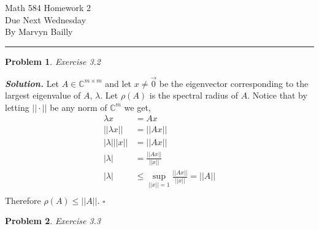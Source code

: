\documentclass[12pt]{report}
\newtheorem{problem}{Problem}
\newenvironment{solution}[1][\it{Solution}]{\textbf{#1. } }{$\square$}
\def\C{{\mathbb C}}
\begin{document}
\large

\begin{center}
 Math 584 Homework 2\\
 Due Next Wednesday\\
 By Marvyn Bailly\\
\end{center}

\normalsize

\hrule



\begin{problem}
    Exercise 3.2
\end{problem}

\begin{solution}
    \noindent
    Let $A \in \C^{m\times m}$ and let $x \neq \vec{0}$ be the eigenvector corresponding to the largest eigenvalue of $A$, $\lambda$. Let 
    $\rho (A)$ is the spectral radius of $A$. Notice that by letting $||\cdot||$ be any norm of $\C^m$ we get,
    \begin{align*}
        \lambda x &= Ax\\
        ||\lambda x|| &= ||Ax||\\
        |\lambda| ||x|| &= ||Ax||\\
        |\lambda| &= \frac{||Ax||}{||x||}\\
        |\lambda| &\leq \sup_{||x|| = 1} \frac{||Ax||}{||x||} = ||A||\\
    \end{align*}
    Therefore $\rho(A) \leq ||A||$.
\end{solution}




\begin{problem}
    Exercise 3.3
\end{problem}
\end{document}
